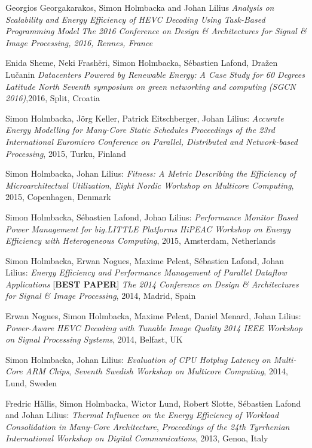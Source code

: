 \documentclass[margin,line]{resume}
\begin{document}
\begin{resume}
Georgios Georgakarakos, Simon Holmbacka and Johan Lilius
\textit{Analysis on Scalability and Energy Efficiency of HEVC Decoding Using Task-Based Programming Model}
\textsl{The 2016 Conference on Design \& Architectures for Signal \& Image Processing, 2016, Rennes, France}

Enida Sheme, Neki Frash\"{e}ri, Simon Holmbacka, S\'{e}bastien Lafond, Dra\v{z}en Lu\v{c}anin 
\textit{Datacenters Powered by Renewable Energy: A Case Study for 60 Degrees Latitude North}
\textsl{Seventh symposium on green networking and computing (SGCN 2016)},2016, Split, Croatia

Simon Holmbacka, J\"{o}rg Keller, Patrick Eitschberger, Johan Lilius:
\textit{Accurate Energy Modelling for Many-Core Static Schedules}
\textsl{Proceedings of the 23rd International Euromicro Conference on Parallel, Distributed and Network-based Processing}, 2015, Turku, Finland

Simon Holmbacka, Johan Lilius: 
\textit{Fitness: A Metric Describing the Efficiency of Microarchitectual Utilization},
\textsl{Eight Nordic Workshop on Multicore Computing}, 2015, Copenhagen, Denmark

Simon Holmbacka, S\'{e}bastien Lafond, Johan Lilius:
\textit{Performance Monitor Based Power Management for big.LITTLE Platforms}
\textsl{HiPEAC Workshop on Energy Efficiency with Heterogeneous Computing}, 2015, Amsterdam, Netherlands
\clearpage

Simon Holmbacka, Erwan Nogues, Maxime Pelcat, S\'{e}bastien Lafond, Johan Lilius:
\textit{Energy Efficiency and Performance Management of Parallel Dataflow Applications} [\textbf{BEST PAPER}]
\textsl{The 2014 Conference on Design \& Architectures for Signal \& Image Processing}, 2014, Madrid, Spain

Erwan Nogues, Simon Holmbacka, Maxime Pelcat, Daniel Menard, Johan Lilius:
\textit{Power-Aware HEVC Decoding with Tunable Image Quality}
\textsl{2014 IEEE Workshop on Signal Processing Systems}, 2014, Belfast, UK

Simon Holmbacka, Johan Lilius: 
\textit{Evaluation of CPU Hotplug Latency on Multi-Core ARM Chips},
\textsl{Seventh Swedish Workshop on Multicore Computing}, 2014, Lund, Sweden 

Fredric H\"{a}llis, Simon Holmbacka, Wictor Lund, Robert Slotte, S\'{e}bastien Lafond and Johan Lilius:
\textit{Thermal Influence on the Energy Efficiency of Workload Consolidation in Many-Core Architecture}, 
\textsl{Proceedings of the 24th Tyrrhenian International Workshop on Digital Communications}, 2013, Genoa, Italy 


\end{resume}
\end{document}

